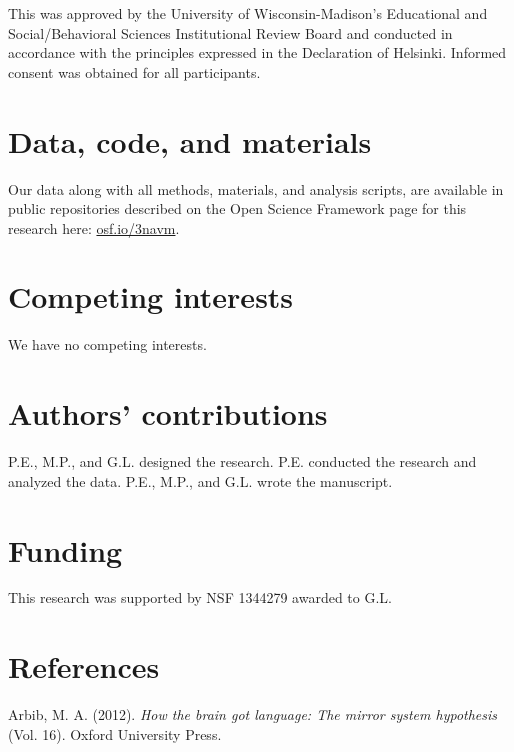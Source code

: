 \documentclass[english,floatsintext,man]{apa6}
\theoremstyle{definition}
\theoremstyle{definition}
\theoremstyle{definition}
\theoremstyle{remark}
\begin{document}
This was approved by the University of Wisconsin-Madison's Educational
and Social/Behavioral Sciences Institutional Review Board and conducted
in accordance with the principles expressed in the Declaration of
Helsinki. Informed consent was obtained for all participants.

\hypertarget{data-code-and-materials}{%
\section{Data, code, and materials}\label{data-code-and-materials}}

Our data along with all methods, materials, and analysis scripts, are
available in public repositories described on the Open Science Framework
page for this research here: \href{https://osf.io/3navm}{osf.io/3navm}.

\hypertarget{competing-interests}{%
\section{Competing interests}\label{competing-interests}}

We have no competing interests.

\hypertarget{authors-contributions}{%
\section{Authors' contributions}\label{authors-contributions}}

P.E., M.P., and G.L. designed the research. P.E. conducted the research
and analyzed the data. P.E., M.P., and G.L. wrote the manuscript.

\hypertarget{funding}{%
\section{Funding}\label{funding}}

This research was supported by NSF 1344279 awarded to G.L.

\hypertarget{references}{%
\section{References}\label{references}}

\setlength{\parindent}{-0.5in}\setlength{\leftskip}{0.5in}

\hypertarget{refs}{}
\leavevmode\hypertarget{ref-Arbib:2012htb}{}%
Arbib, M. A. (2012). \emph{How the brain got language: The mirror system
hypothesis} (Vol. 16). Oxford University Press.
\end{document}
